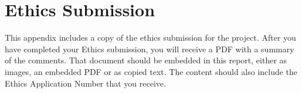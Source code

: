 \chapter{Ethics Submission}

This appendix includes a copy of the ethics submission for the project. After you have completed your Ethics submission, you will receive a PDF with a summary of the comments. That document should be embedded in this report, either as images, an embedded PDF or as copied text. The content should also include the Ethics Application Number that you receive. 

